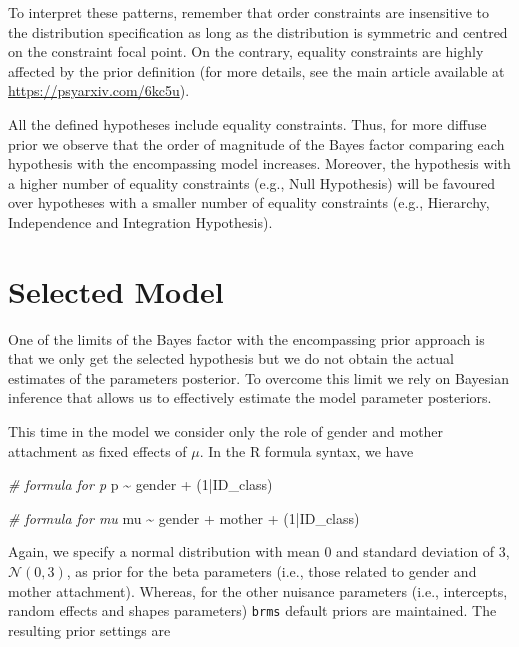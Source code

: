 \documentclass[
]{book}
\newenvironment{Shaded}{\begin{snugshade}}{\end{snugshade}}
\newcommand{\CommentTok}[1]{\textcolor[rgb]{0.56,0.35,0.01}{\textit{#1}}}
\newcommand{\DecValTok}[1]{\textcolor[rgb]{0.00,0.00,0.81}{#1}}
\newcommand{\NormalTok}[1]{#1}
\newcommand{\SpecialCharTok}[1]{\textcolor[rgb]{0.00,0.00,0.00}{#1}}
\begin{document}
To interpret these patterns, remember that order constraints are insensitive to the distribution specification as long as the distribution is symmetric and centred on the constraint focal point. On the contrary, equality constraints are highly affected by the prior definition (for more details, see the main article available at \url{https://psyarxiv.com/6kc5u}).

All the defined hypotheses include equality constraints. Thus, for more diffuse prior we observe that the order of magnitude of the Bayes factor comparing each hypothesis with the encompassing model increases. Moreover, the hypothesis with a higher number of equality constraints (e.g., Null Hypothesis) will be favoured over hypotheses with a smaller number of equality constraints (e.g., Hierarchy, Independence and Integration Hypothesis).

\hypertarget{selected-model-1}{%
\section{Selected Model}\label{selected-model-1}}

One of the limits of the Bayes factor with the encompassing prior approach is that we only get the selected hypothesis but we do not obtain the actual estimates of the parameters posterior. To overcome this limit we rely on Bayesian inference that allows us to effectively estimate the model parameter posteriors.

This time in the model we consider only the role of gender and mother attachment as fixed effects of \(\mu\). In the R formula syntax, we have

\begin{Shaded}
\begin{Highlighting}[]
\CommentTok{\# formula for p}
\NormalTok{p }\SpecialCharTok{\textasciitilde{}}\NormalTok{ gender }\SpecialCharTok{+}\NormalTok{ (}\DecValTok{1}\SpecialCharTok{|}\NormalTok{ID\_class)}

\CommentTok{\# formula for mu}
\NormalTok{mu }\SpecialCharTok{\textasciitilde{}}\NormalTok{ gender }\SpecialCharTok{+}\NormalTok{ mother }\SpecialCharTok{+}\NormalTok{ (}\DecValTok{1}\SpecialCharTok{|}\NormalTok{ID\_class)}
\end{Highlighting}
\end{Shaded}

Again, we specify a normal distribution with mean 0 and standard deviation of 3, \(\mathcal{N}(0,3)\), as prior for the beta parameters (i.e., those related to gender and mother attachment). Whereas, for the other nuisance parameters (i.e., intercepts, random effects and shapes parameters) \texttt{brms} default priors are maintained. The resulting prior settings are
\end{document}
